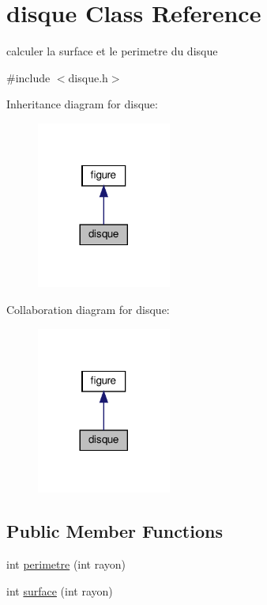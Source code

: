 \hypertarget{classdisque}{}\section{disque Class Reference}
\label{classdisque}


calculer la surface et le perimetre du disque  




{\ttfamily \#include $<$disque.\+h$>$}



Inheritance diagram for disque\+:
\nopagebreak
\begin{figure}[H]
\begin{center}
\leavevmode
\includegraphics[width=125pt]{classdisque__inherit__graph}
\end{center}
\end{figure}


Collaboration diagram for disque\+:
\nopagebreak
\begin{figure}[H]
\begin{center}
\leavevmode
\includegraphics[width=125pt]{classdisque__coll__graph}
\end{center}
\end{figure}
\subsection*{Public Member Functions}
\begin{DoxyCompactItemize}
\item 
int \hyperlink{classdisque_a48361c6c20641c3da6db79b05e8facd6}{perimetre} (int rayon)
\item 
int \hyperlink{classdisque_a24cfaf289fe88cfcf71e3968edbd9bf4}{surface} (int rayon)
\end{DoxyCompactItemize}


